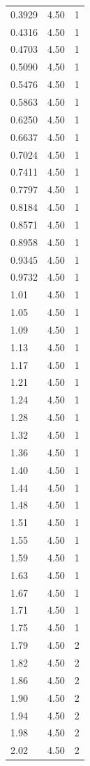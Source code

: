 \begin{longtable}{lrr}
  0.3929 & 4.50 & 1 \\
  0.4316 & 4.50 & 1 \\
  0.4703 & 4.50 & 1 \\
  0.5090 & 4.50 & 1 \\
  0.5476 & 4.50 & 1 \\
  0.5863 & 4.50 & 1 \\
  0.6250 & 4.50 & 1 \\
  0.6637 & 4.50 & 1 \\
  0.7024 & 4.50 & 1 \\
  0.7411 & 4.50 & 1 \\
  0.7797 & 4.50 & 1 \\
  0.8184 & 4.50 & 1 \\
  0.8571 & 4.50 & 1 \\
  0.8958 & 4.50 & 1 \\
  0.9345 & 4.50 & 1 \\
  0.9732 & 4.50 & 1 \\
  1.01 & 4.50 & 1 \\
  1.05 & 4.50 & 1 \\
  1.09 & 4.50 & 1 \\
  1.13 & 4.50 & 1 \\
  1.17 & 4.50 & 1 \\
  1.21 & 4.50 & 1 \\
  1.24 & 4.50 & 1 \\
  1.28 & 4.50 & 1 \\
  1.32 & 4.50 & 1 \\
  1.36 & 4.50 & 1 \\
  1.40 & 4.50 & 1 \\
  1.44 & 4.50 & 1 \\
  1.48 & 4.50 & 1 \\
  1.51 & 4.50 & 1 \\
  1.55 & 4.50 & 1 \\
  1.59 & 4.50 & 1 \\
  1.63 & 4.50 & 1 \\
  1.67 & 4.50 & 1 \\
  1.71 & 4.50 & 1 \\
  1.75 & 4.50 & 1 \\
  1.79 & 4.50 & 2 \\
  1.82 & 4.50 & 2 \\
  1.86 & 4.50 & 2 \\
  1.90 & 4.50 & 2 \\
  1.94 & 4.50 & 2 \\
  1.98 & 4.50 & 2 \\
  2.02 & 4.50 & 2 \\

\end{longtable}
